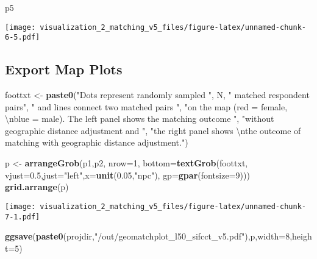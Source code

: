 \documentclass[
]{article}
\newenvironment{Shaded}{\begin{snugshade}}{\end{snugshade}}
\newcommand{\CharTok}[1]{\textcolor[rgb]{0.31,0.60,0.02}{#1}}
\newcommand{\DataTypeTok}[1]{\textcolor[rgb]{0.13,0.29,0.53}{#1}}
\newcommand{\DecValTok}[1]{\textcolor[rgb]{0.00,0.00,0.81}{#1}}
\newcommand{\FloatTok}[1]{\textcolor[rgb]{0.00,0.00,0.81}{#1}}
\newcommand{\KeywordTok}[1]{\textcolor[rgb]{0.13,0.29,0.53}{\textbf{#1}}}
\newcommand{\NormalTok}[1]{#1}
\newcommand{\StringTok}[1]{\textcolor[rgb]{0.31,0.60,0.02}{#1}}
\begin{document}
\begin{Shaded}
\begin{Highlighting}[]
\NormalTok{p5}
\end{Highlighting}
\end{Shaded}

\texttt{[image: visualization\_2\_matching\_v5\_files/figure-latex/unnamed-chunk-6-5.pdf]}

\hypertarget{export-map-plots}{%
\subsection{Export Map Plots}\label{export-map-plots}}

\begin{Shaded}
\begin{Highlighting}[]
\NormalTok{foottxt <-}\StringTok{ }\KeywordTok{paste0}\NormalTok{(}\StringTok{"Dots represent randomly sampled "}\NormalTok{, N, }\StringTok{" matched respondent pairs"}\NormalTok{,}
                  \StringTok{" and lines connect two matched pairs "}\NormalTok{,}
                  \StringTok{"on the map (red = female, }\CharTok{\textbackslash{}n}\StringTok{blue = male). The left panel shows the matching outcome "}\NormalTok{,}
                  \StringTok{"without geographic distance adjustment and "}\NormalTok{,}
                  \StringTok{"the right panel shows }\CharTok{\textbackslash{}n}\StringTok{the outcome of matching with geographic distance adjustment."}\NormalTok{)}

\NormalTok{p <-}\StringTok{ }\KeywordTok{arrangeGrob}\NormalTok{(p1,p2, }\DataTypeTok{nrow=}\DecValTok{1}\NormalTok{,}
                 \DataTypeTok{bottom=}\KeywordTok{textGrob}\NormalTok{(foottxt, }\DataTypeTok{vjust=}\FloatTok{0.5}\NormalTok{,}\DataTypeTok{just=}\StringTok{"left"}\NormalTok{,}\DataTypeTok{x=}\KeywordTok{unit}\NormalTok{(}\FloatTok{0.05}\NormalTok{,}\StringTok{"npc"}\NormalTok{),}
                                 \DataTypeTok{gp=}\KeywordTok{gpar}\NormalTok{(}\DataTypeTok{fontsize=}\DecValTok{9}\NormalTok{)))}
\KeywordTok{grid.arrange}\NormalTok{(p)}
\end{Highlighting}
\end{Shaded}

\texttt{[image: visualization\_2\_matching\_v5\_files/figure-latex/unnamed-chunk-7-1.pdf]}

\begin{Shaded}
\begin{Highlighting}[]
\KeywordTok{ggsave}\NormalTok{(}\KeywordTok{paste0}\NormalTok{(projdir,}\StringTok{"/out/geomatchplot_l50_sifcct_v5.pdf"}\NormalTok{),p,}\DataTypeTok{width=}\DecValTok{8}\NormalTok{,}\DataTypeTok{height=}\DecValTok{5}\NormalTok{)}
\end{Highlighting}
\end{Shaded}
\end{document}
